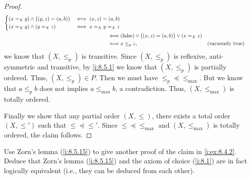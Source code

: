 \begin{proof}
\begin{align*}
\begin{dcases}
             (x =_X y) \land \big((y, z) = (a, b)\big)                 & \iff (x, z) = (a, b) \\
             (x =_X y) \land (y =_X z)                                 & \iff x =_X y =_X z
           \end{dcases}                                 \\
    \iff & (\text{false}) \lor \big((x, z) = (a, b)\big) \lor (x =_X z)                                                     \\
    \iff & x \leq_p z,                                                                         &  & \text{(vacuously true)}
  \end{align*}
  we know that \((X, \leq_p)\) is transitive.
  Since \((X, \leq_p)\) is reflexive, anti-symmetric and transitive, by \cref{i:8.5.1} we know that \((X, \leq_p)\) is partially ordered.
  Thus, \((X, \leq_p) \in P\).
  Then we must have \(\leq_p \preceq \leq_{\max}\).
  But we know that \(a \leq_p b\) does not implies \(a \leq_{\max} b\), a contradiction.
  Thus, \((X, \leq_{\max})\) is totally ordered.

  Finally we show that any partial order \((X, \leq)\), there exists a total order \((X, \leq')\) such that \(\leq \preceq \leq'\).
  Since \(\leq \preceq \leq_{\max}\) and \((X, \leq_{\max})\) is totally ordered, the claim follows.
\end{proof}

\begin{ex}\label{i:ex:8.5.17}
  Use Zorn's lemma (\cref{i:8.5.15}) to give another proof of the claim in \cref{i:ex:8.4.2}.
  Deduce that Zorn's lemma (\cref{i:8.5.15}) and the axiom of choice (\cref{i:8.1}) are in fact logically equivalent
  (i.e., they can be deduced from each other).
\end{ex}

